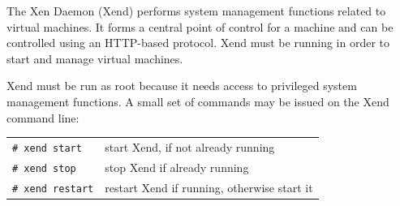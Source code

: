\documentclass[11pt,twoside,final,openright]{xenstyle}
\begin{document}
The Xen Daemon (Xend) performs system management functions related to
virtual machines.  It forms a central point of control for a machine
and can be controlled using an HTTP-based protocol.  Xend must be
running in order to start and manage virtual machines.

Xend must be run as root because it needs access to privileged system
management functions.  A small set of commands may be issued on the
Xend command line:

\begin{tabular}{ll}
\verb_# xend start_ & start Xend, if not already running \\
\verb_# xend stop_  & stop Xend if already running       \\
\verb_# xend restart_ & restart Xend if running, otherwise start it \\
\end{tabular}
\end{document}
